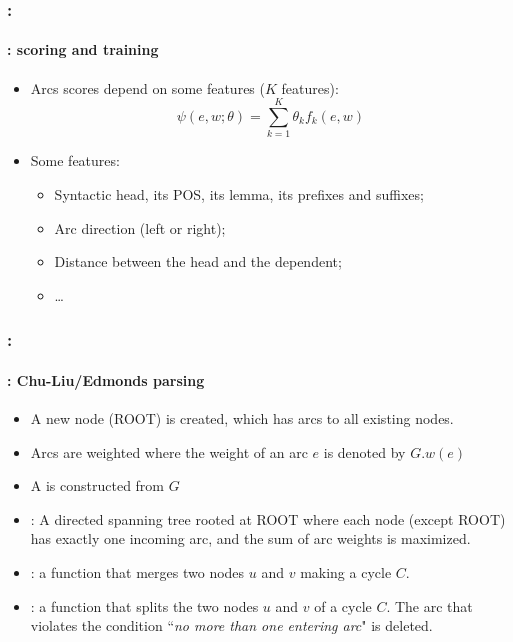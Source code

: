 \documentclass[xcolor=table]{beamer}
\begin{document}
\begin{frame}
	\frametitle{\insertshortsubtitle: \insertsection}
	\framesubtitle{\insertsubsection: scoring and training}

	\begin{itemize}
		\item Arcs scores depend on some features ($K$ features):
		\[ \psi(e, w; \theta) = \sum_{k = 1}^{K} \theta_k f_k(e, w)  \]
		
		\item Some features:
		\begin{itemize}
			\item Syntactic head, its POS, its lemma, its prefixes and suffixes;
			\item Arc direction (left or right);
			\item Distance between the head and the dependent;
			\item \ldots
		\end{itemize}	
	\end{itemize}

\end{frame}

\begin{frame}
	\frametitle{\insertshortsubtitle: \insertsection}
	\framesubtitle{\insertsubsection: Chu-Liu/Edmonds parsing}

	\begin{itemize}
		\item A new node (ROOT) is created, which has arcs to all existing nodes.
		\item Arcs are weighted where the weight of an arc $e$ is denoted by $G.w(e)$
		\item A  is constructed from $G$
		\item {}: A directed spanning tree rooted at ROOT where each node (except ROOT) has exactly one incoming arc, and the sum of arc weights is maximized.
		\item {}: a function that merges two nodes $u$ and $v$ making a cycle $C$.
		\item {}: a function that splits the two nodes $u$ and $v$ of a cycle $C$. The arc that violates the condition ``\textit{no more than one entering arc}" is deleted.
	\end{itemize}
 
\end{frame}
\end{document}
